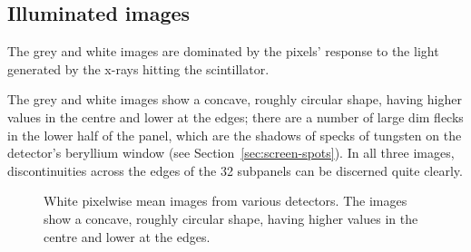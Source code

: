 \documentclass[\main/IO-Pixels.tex]{subfiles}
\begin{document}
\subsection{Illuminated images}

The grey and white images are dominated by the pixels' response to the light generated by the x-rays hitting the scintillator.

 The grey and white images show a concave, roughly circular shape, having higher values in the centre and lower at the edges; there are a number of large dim flecks in the lower half of the panel, which are the shadows of specks of tungsten on the detector's beryllium window (see Section~\ref{sec:screen-spots}). In all three images, discontinuities across the edges of the 32 subpanels can be discerned quite clearly.
\begin{figure}
\caption{White pixelwise mean images from various detectors. The images show a concave, roughly circular shape, having higher values in the centre and lower at the edges.}

%
%
%
%

\end{figure}
\end{document}
